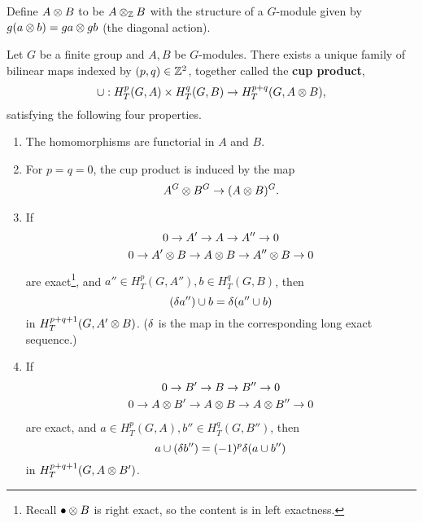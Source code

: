 Define $A\otimes B$ to be $A\otimes_{\mathbb{Z}} B$ with the structure of a $G$-module given by $g(a\otimes b)=ga\otimes gb$ (the diagonal action).
\begin{thm}
Let $G$ be a finite group and $A,B$ be $G$-modules. There exists a unique family of bilinear maps indexed by $(p,q)\in \mathbb{Z}^2$, together called the \textbf{cup product}, 
\[
\cup: H_T^p(G,A)\times H_T^q(G,B) \to H_T^{p+q}(G,A\otimes B),
\]
satisfying the following four properties.
\begin{enumerate}
\item
The homomorphisms are functorial in $A$ and $B$.
\item
For $p=q=0$, the cup product is induced by the map
\[
A^G\otimes B^G \rightarrow (A\otimes B)^G.
\]
\item If 
\begin{gather*}
0\to A'\to A\to A''\to 0\\
0\to A'\otimes B\to A\otimes B\to A''\otimes B\to 0
\end{gather*}
are exact\footnote{Recall $\bullet \otimes B$ is right exact, so the content is in left exactness.}, and $a''\in H_T^p(G,A''), b\in H_T^q(G,B)$, then
\[
(\delta a'')\cup b = \delta(a''\cup b)
\]
in $H_T^{p+q+1}(G,A'\otimes B)$. ($\delta$ is the map in the corresponding long exact sequence.) %
\item If 
\begin{gather*}
0\to B'\to B\to B''\to 0\\
0\to A\otimes B'\to A\otimes B\to A\otimes B''\to 0
\end{gather*}
are exact, and $a\in H_T^p(G,A), b''\in H_T^q(G,B'')$, then
\[
a\cup (\delta b'') = (-1)^p\delta(a\cup b'')
\]
in $H_T^{p+q+1}(G,A\otimes B')$. %
\end{enumerate}
\end{thm}
